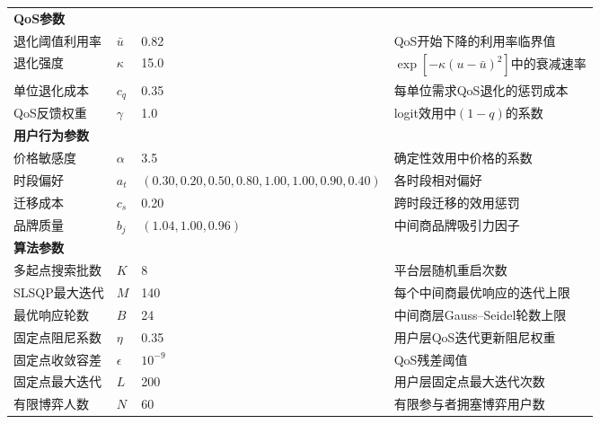 \documentclass[UTF8,a4paper,11pt]{ctexart}
\begin{document}
\begin{table}[H]
{\begin{tabular}{llll}
\midrule
\multicolumn{4}{l}{\textbf{QoS参数}} \\
退化阈值利用率 & $\bar u$ & 0.82 & QoS开始下降的利用率临界值 \\
退化强度 & $\kappa$ & 15.0 & $\exp[-\kappa(u-\bar u)^2]$中的衰减速率 \\
单位退化成本 & $c_q$ & 0.35 & 每单位需求QoS退化的惩罚成本 \\
QoS反馈权重 & $\gamma$ & 1.0 & logit效用中$(1-q)$的系数 \\
\midrule
\multicolumn{4}{l}{\textbf{用户行为参数}} \\
价格敏感度 & $\alpha$ & 3.5 & 确定性效用中价格的系数 \\
时段偏好 & $a_t$ & $(0.30,0.20,0.50,0.80,1.00,1.00,0.90,0.40)$ & 各时段相对偏好 \\
迁移成本 & $c_s$ & 0.20 & 跨时段迁移的效用惩罚 \\
品牌质量 & $b_j$ & $(1.04,1.00,0.96)$ & 中间商品牌吸引力因子 \\
\midrule
\multicolumn{4}{l}{\textbf{算法参数}} \\
多起点搜索批数 & $K$ & 8 & 平台层随机重启次数 \\
SLSQP最大迭代 & $M$ & 140 & 每个中间商最优响应的迭代上限 \\
最优响应轮数 & $B$ & 24 & 中间商层Gauss--Seidel轮数上限 \\
固定点阻尼系数 & $\eta$ & 0.35 & 用户层QoS迭代更新阻尼权重 \\
固定点收敛容差 & $\epsilon$ & $10^{-9}$ & QoS残差阈值 \\
固定点最大迭代 & $L$ & 200 & 用户层固定点最大迭代次数 \\
有限博弈人数 & $N$ & 60 & 有限参与者拥塞博弈用户数 \\
\bottomrule
\end{tabular}%
}
\end{table}
\end{document}

